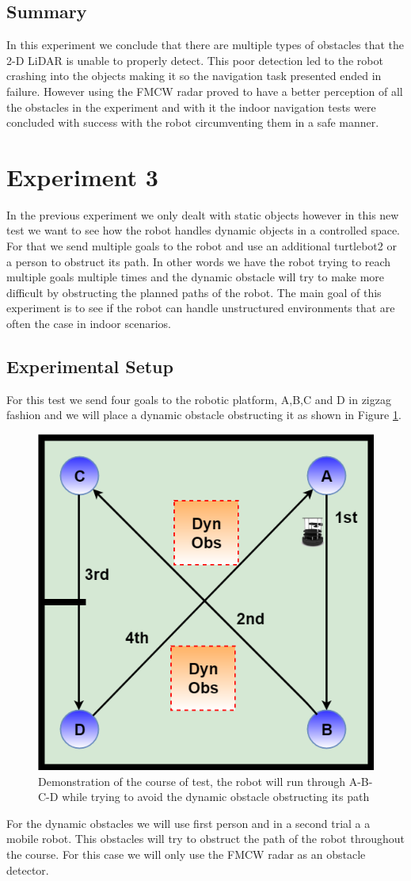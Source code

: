\subsection{Summary}
In this experiment we conclude that there are multiple types of obstacles that the 2-D LiDAR is unable to properly detect. This poor detection led to the robot crashing into the objects making it so the navigation task presented ended in failure. However using the \ac{FMCW} radar proved to have a better perception of all the obstacles in the experiment and with it the indoor navigation tests were concluded with success with the robot circumventing them in a safe manner.
\section{Experiment 3}
In the previous experiment we only dealt with static objects however in this new test we want to see how the robot handles dynamic objects in a controlled space. For that we send multiple goals  to the robot and use an additional turtlebot2 or a person to obstruct its path. In other words we have the robot trying to reach multiple goals multiple times and the dynamic obstacle will try to make more difficult by obstructing the planned paths of the robot.  The main goal of this experiment is to see if the robot can handle unstructured environments that are often the case in indoor scenarios.
\subsection{Experimental Setup}
For this test we send four goals to the robotic platform, A,B,C and D in zigzag fashion and we will place a dynamic obstacle obstructing it as shown in Figure \ref{fig:exp3}.

\begin{figure}[ht!]
\centerline{\includegraphics [width=0.5 \textwidth]{imgs/chapter5/exp3.png}}
\caption{Demonstration of the course of test, the robot will run through A-B-C-D  while  trying to avoid the dynamic obstacle obstructing its path}
\label{fig:exp3}
\end{figure}
For the dynamic obstacles we will use first person and in a second trial a a mobile robot. This obstacles will try to obstruct the path of the robot throughout the course. For this case we will only use the \ac{FMCW} \ac{radar} as an obstacle detector.


